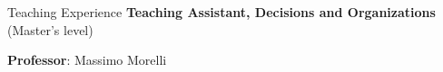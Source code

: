 
\begin{rubric}{Teaching Experience}
\entry*[]
\textbf{Teaching Assistant, Decisions and Organizations} (Master's level)\par
\textbf{Professor}: Massimo Morelli
\end{rubric}
